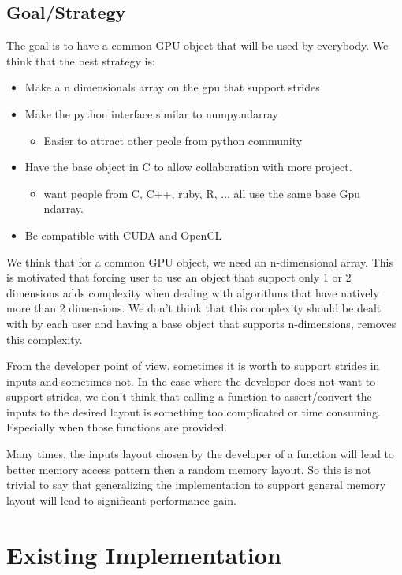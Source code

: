 \documentclass{article} %
\begin{document}
\subsection{Goal/Strategy}
The goal is to have a common GPU object that will be used by everybody. We think that the best strategy is:

\begin{itemize}
\item Make a n dimensionals array on the gpu that support strides
\item Make the python interface similar to numpy.ndarray
  \begin{itemize}
  \item Easier to attract other peole from python community
  \end{itemize}
\item Have the base object in C to allow collaboration with more project.
  \begin{itemize}
  \item  want people from C, C++, ruby, R, ... all use the same base Gpu ndarray.
  \end{itemize}
\item Be compatible with CUDA and OpenCL
\end{itemize}


We think that for a common GPU object, we need an n-dimensional
array. This is motivated that forcing user to use an object that
support only 1 or 2 dimensions adds complexity when dealing with algorithms that have natively more than 2 dimensions.
We don't think that this complexity should be dealt with by each user and 
having a base object that supports n-dimensions, removes
this complexity.

From the developer point of view, sometimes it is worth to support
strides in inputs and sometimes not.  In the case where the developer does not want to support strides, we don't think
that calling a function to assert/convert the inputs to the desired layout is something too complicated or time consuming.
Especially when those functions are provided.

Many times, the inputs layout chosen by the developer of a function
will lead to better memory access pattern then a random memory
layout. So this is not trivial to say that generalizing the
implementation to support general memory layout will lead to
significant performance gain. 

\section{Existing Implementation}
\end{document}
